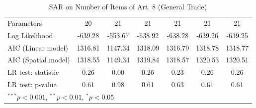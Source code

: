 \begin{table}[!h]
\begin{center}
\begin{tabular}{l c c c c c c }
Parameters              & 20           & 21           & 21           & 21           & 21           & 21           \\
Log Likelihood          & -639.28      & -553.67      & -638.92      & -638.28      & -639.26      & -639.25      \\
AIC (Linear model)      & 1316.81      & 1147.34      & 1318.09      & 1316.79      & 1318.78      & 1318.77      \\
AIC (Spatial model)     & 1318.55      & 1149.34      & 1319.84      & 1318.57      & 1320.53      & 1320.51      \\
LR test: statistic      & 0.26         & 0.00         & 0.26         & 0.23         & 0.26         & 0.26         \\
LR test: p-value        & 0.61         & 0.98         & 0.61         & 0.63         & 0.61         & 0.61         \\
\bottomrule
\multicolumn{7}{l}{\scriptsize{$^{***}p<0.001$, $^{**}p<0.01$, $^*p<0.05$}}
\end{tabular}
\caption{SAR on Number of Items of Art. 8 (General Trade)}
\label{table:coefficients}
\end{center}
\end{table}
